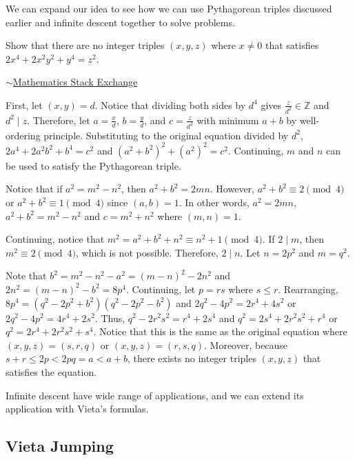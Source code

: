 \documentclass[../../../main.tex]{subfiles}
\begin{document}
We can expand our idea to see how we can use Pythagorean triples
discussed earlier and infinite descent together to solve problems.

\begin{problem}{}{}
Show that there are no integer triples $(x, y, z)$ where $x \neq 0$
that satisfies $2x^4 + 2x^2y^2 + y^4 = z^2$.

\hfill$\sim$\href{https://math.stackexchange.com/questions/4892263/diophantine-equation-2x4-2x2-y2-y4-z2}{Mathematics Stack Exchange}
\end{problem}
\begin{solution}
First, let $(x, y) = d$. Notice that dividing both sides by $d^4$
gives $\frac{z}{d^2} \in \mathbb{Z}$ and $d^2 \mid z$. Therefore,
let $a = \frac{x}{d}$, $b = \frac{y}{d}$, and $c = \frac{z}{d^2}$
with minimum $a + b$ by well-ordering principle. Substituting to the
original equation divided by $d^2$, $2a^4 + 2a^2b^2 + b^4 = c^2$
and $(a^2 + b^2)^2 + (a^2)^2 = c^2$. Continuing, $m$ and $n$ can be
used to satisfy the Pythagorean triple.

Notice that if $a^2 = m^2 - n^2$, then $a^2 + b^2 = 2mn$. However,
$a^2 + b^2 \equiv 2 \pmod{4}$ or $a^2 + b^2 \equiv 1 \pmod{4}$
since $(a, b) = 1$. In other words, $a^2 = 2mn$, $a^2 + b^2 =
m^2 - n^2$ and $c = m^2 + n^2$ where $(m, n) = 1$.

Continuing, notice that $m^2 = a^2 + b^2 + n^2 \equiv n^2 + 1
\pmod{4}$. If $2 \mid m$, then $m^2 \equiv 2 \pmod{4}$, which is not
possible. Therefore, $2 \mid n$. Let $n = 2p^2$ and $m = q^2$.

Note that $b^2 = m^2 - n^2 - a^2 = (m - n)^2 - 2n^2$ and
$2n^2 = (m - n)^2 - b^2 = 8p^4$. Continuing, let $p = rs$
where $s \leq r$. Rearranging, $8p^4 = (q^2 - 2p^2 + b^2)
(q^2 - 2p^2 - b^2)$ and $2q^2 - 4p^2 = 2r^4 + 4s^2$ or
$2q^2 - 4p^2 = 4r^4 + 2s^2$. Thus, $q^2 - 2r^2s^2 = r^4 + 2s^4$ and
$q^2 = 2s^4 + 2r^2s^2 + r^4$ or $q^2 = 2r^4 + 2r^2s^2 + s^4$.
Notice that this is the same as the original equation where
$(x, y, z) = (s, r, q)$ or $(x, y, z) = (r, s, q)$. Moreover,
because $s + r \leq 2p < 2pq = a < a + b$, there exists no integer
triples $(x, y, z)$ that satisfies the equation.
\end{solution}

Infinite descent have wide range of applications, and we can
extend its application with Vieta's formulas.

\subsection{Vieta Jumping}
\end{document}
